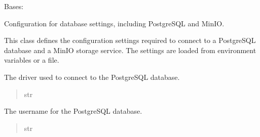 \documentclass[letterpaper,10pt,english]{sphinxmanual}
\begin{document}
\begin{fulllineitems}
\label{\detokenize{config:config.db.DataBaseSettings}}
\pysigstartsignatures
{}
\pysigstopsignatures
\sphinxAtStartPar
Bases: 

\sphinxAtStartPar
Configuration for database settings, including PostgreSQL and MinIO.

\sphinxAtStartPar
This class defines the configuration settings required to connect to a PostgreSQL database
and a MinIO storage service. The settings are loaded from environment variables or a  file.

\begin{fulllineitems}
\label{\detokenize{config:config.db.DataBaseSettings.POSTGRES_DRIVER}}
\pysigstartsignatures
{}
\pysigstopsignatures
\sphinxAtStartPar
The driver used to connect to the PostgreSQL database.
\begin{quote}\begin{description}
\sphinxAtStartPar
str

\end{description}\end{quote}

\end{fulllineitems}


\begin{fulllineitems}
\label{\detokenize{config:config.db.DataBaseSettings.POSTGRES_USERNAME}}
\pysigstartsignatures
{}
\pysigstopsignatures
\sphinxAtStartPar
The username for the PostgreSQL database.
\begin{quote}\begin{description}
\sphinxAtStartPar
str


\end{description}
\end{quote}
\end{fulllineitems}
\end{fulllineitems}
\end{document}

